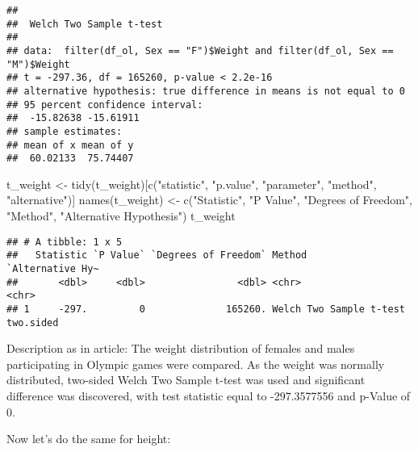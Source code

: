\documentclass[
]{article}
\newenvironment{Shaded}{\begin{snugshade}}{\end{snugshade}}
\newcommand{\FunctionTok}[1]{\textcolor[rgb]{0.00,0.00,0.00}{#1}}
\newcommand{\NormalTok}[1]{#1}
\newcommand{\OtherTok}[1]{\textcolor[rgb]{0.56,0.35,0.01}{#1}}
\newcommand{\StringTok}[1]{\textcolor[rgb]{0.31,0.60,0.02}{#1}}
\begin{document}
\begin{verbatim}
## 
##  Welch Two Sample t-test
## 
## data:  filter(df_ol, Sex == "F")$Weight and filter(df_ol, Sex == "M")$Weight
## t = -297.36, df = 165260, p-value < 2.2e-16
## alternative hypothesis: true difference in means is not equal to 0
## 95 percent confidence interval:
##  -15.82638 -15.61911
## sample estimates:
## mean of x mean of y 
##  60.02133  75.74407
\end{verbatim}

\begin{Shaded}
\begin{Highlighting}[]
\NormalTok{t\_weight }\OtherTok{\textless{}{-}} \FunctionTok{tidy}\NormalTok{(t\_weight)[}\FunctionTok{c}\NormalTok{(}\StringTok{"statistic"}\NormalTok{, }\StringTok{"p.value"}\NormalTok{, }\StringTok{"parameter"}\NormalTok{, }\StringTok{"method"}\NormalTok{, }\StringTok{"alternative"}\NormalTok{)]}
\FunctionTok{names}\NormalTok{(t\_weight) }\OtherTok{\textless{}{-}} \FunctionTok{c}\NormalTok{(}\StringTok{"Statistic"}\NormalTok{, }\StringTok{"P Value"}\NormalTok{, }\StringTok{"Degrees of Freedom"}\NormalTok{, }\StringTok{"Method"}\NormalTok{, }\StringTok{"Alternative Hypothesis"}\NormalTok{)}
\NormalTok{t\_weight}
\end{Highlighting}
\end{Shaded}

\begin{verbatim}
## # A tibble: 1 x 5
##   Statistic `P Value` `Degrees of Freedom` Method                  `Alternative Hy~
##       <dbl>     <dbl>                <dbl> <chr>                   <chr>           
## 1     -297.         0              165260. Welch Two Sample t-test two.sided
\end{verbatim}

Description as in article: The weight distribution of females and males
participating in Olympic games were compared. As the weight was normally
distributed, two-sided Welch Two Sample t-test was used and significant
difference was discovered, with test statistic equal to -297.3577556 and
p-Value of 0.

Now let's do the same for height:
\end{document}
